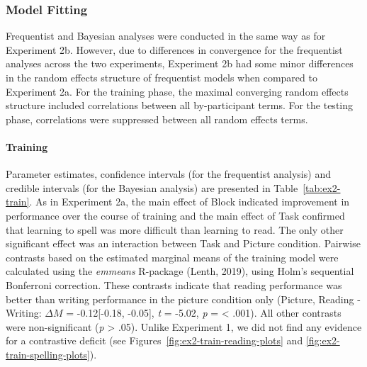 \documentclass[doc,floatsintext]{apa6}
\let\oldparagraph\paragraph
\renewcommand{\paragraph}[1]{\oldparagraph{#1}\mbox{}}
\begin{document}
\subsubsection{Model Fitting}\label{model-fitting-2}

Frequentist and Bayesian analyses were conducted in the same way as for
Experiment 2b. However, due to differences in convergence for the
frequentist analyses across the two experiments, Experiment 2b had some
minor differences in the random effects structure of frequentist models
when compared to Experiment 2a. For the training phase, the maximal
converging random effects structure included correlations between all
by-participant terms. For the testing phase, correlations were
suppressed between all random effects terms.

\paragraph{Training}\label{training-2}

Parameter estimates, confidence intervals (for the frequentist analysis)
and credible intervals (for the Bayesian analysis) are presented in
Table~\ref{tab:ex2-train}. As in Experiment 2a, the main effect of Block
indicated improvement in performance over the course of training and the
main effect of Task confirmed that learning to spell was more difficult
than learning to read. The only other significant effect was an
interaction between Task and Picture condition. Pairwise contrasts based
on the estimated marginal means of the training model were calculated
using the \emph{emmeans} R-package (Lenth, 2019), using Holm's
sequential Bonferroni correction. These contrasts indicate that reading
performance was better than writing performance in the picture condition
only (Picture, Reading - Writing: \(\Delta{M}\) = -0.12{[}-0.18,
-0.05{]}, \emph{t} = -5.02, \emph{p} = \textless{} .001). All other
contrasts were non-significant (\emph{p} \textgreater{} .05). Unlike
Experiment 1, we did not find any evidence for a contrastive deficit
(see Figures~\ref{fig:ex2-train-reading-plots} and
\ref{fig:ex2-train-spelling-plots}).

\newpage
\end{document}
